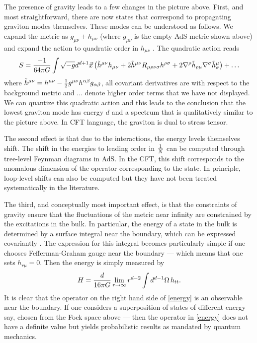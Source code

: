 \documentclass[12pt]{article}
\def\gnewt{G}
\newcommand{\be}{\begin{equation}}
\newcommand{\ee}{\end{equation}}
\begin{document}
The presence of gravity leads to a few changes in the picture above.  First, and most straightforward, there are now states that correspond to propagating graviton modes themselves. These modes can be understood as follows. We expand the metric as $g_{\mu \nu} + h_{\mu \nu}$ (where $g_{\mu \nu}$ is the empty AdS metric shown above) and expand the action to quadratic order in $h_{\mu \nu}$ \cite{Christensen:1979iy}. The quadratic action reads
\begin{equation}
\label{gravityquadratic}
S = {-1 \over 64 \pi \gnewt} \int \sqrt{-g} d^{d+1} \vec{x}  \left(\tilde{h}^{\mu \nu} \Box h_{\mu \nu} + 2 \tilde{h}^{\mu \nu} R_{\mu \rho \nu \sigma} h^{\rho \sigma}  + 2 \nabla^{\rho} \tilde{h}_{\rho \mu} \nabla^{\sigma} \tilde{h}_{\sigma}^{\mu} \right) + \ldots
\end{equation}
where $\tilde{h}^{\mu \nu} = h^{\mu \nu} - {1 \over 2} g^{\mu \nu} h^{\alpha \beta} g_{\alpha \beta}$,  all covariant 
derivatives are with respect to the background metric and $\ldots$ denote higher order terms that we have not displayed. We can quantize this quadratic action and this leads to the conclusion that the lowest graviton mode has energy $d$ and a spectrum that is qualitatively similar to the picture above. In CFT language, the graviton is dual to stress tensor. 

The second effect is that due to the interactions,  the energy levels themselves shift. The shift in the energies to leading order in ${1 \over N}$  can be computed through tree-level Feynman diagrams in AdS. In the CFT,  this shift corresponds to the anomalous dimension of the operator corresponding to the state.  In principle, loop-level shifts can also be computed but they have not been treated systematically in
the literature.

The third, and conceptually most important effect, is that the constraints of gravity ensure that the fluctuations of the metric near infinity are constrained by the excitations in the bulk. In particular, the energy of a state
in the bulk is determined by a surface integral near the boundary, which can be expressed covariantly \cite{Balasubramanian:1999re}. The expression for this integral becomes particularly simple   \cite{deHaro:2000vlm} if one chooses Fefferman-Graham gauge near the boundary --- which means that one sets $h_{r \mu} = 0$. Then the energy is simply measured by
\be
\label{energy}
H = {d \over 16 \pi \gnewt} \lim_{r \rightarrow \infty} r^{d-2} \int  d^{d-1} \Omega \, h_{t t}.
\ee
It is clear that the operator on the right hand side of \eqref{energy} is an observable near the boundary. If one considers a superposition of states of different energy--- say, chosen from the Fock space above --- then the operator in \eqref{energy} does not have a definite value but yields probabilistic results as mandated by quantum mechanics.
\end{document}
